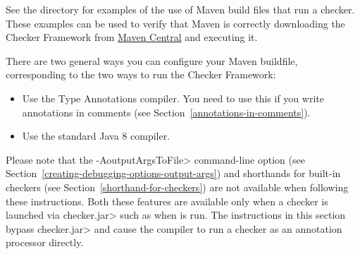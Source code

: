 See the directory  for examples of the use of
Maven build files that run a checker.  These examples can be used to verify that
Maven is correctly downloading the Checker Framework from
\href{http://search.maven.org/#search\%7Cga\%7C1\%7Corg.checkerframework}{Maven
  Central} and executing it.

There are two general ways you can configure your Maven buildfile,
corresponding to the two ways to run the Checker Framework:
\begin{itemize}
\item
  Use the Type Annotations compiler.  You need to use this if you write
  annotations in comments (see Section~\ref{annotations-in-comments}).
\item
  Use the standard Java 8 compiler.
\end{itemize}

Please note that the \<-AoutputArgsToFile> command-line option
(see Section~\ref{creating-debugging-options-output-args}) and shorthands for built-in checkers
(see Section~\ref{shorthand-for-checkers}) are not available when
following these instructions.  Both these features are available only when a checker is
launched via \<checker.jar> such as when 
is run.  The instructions in this section
bypass \<checker.jar> and cause the compiler to run a
checker as an annotation processor directly.

